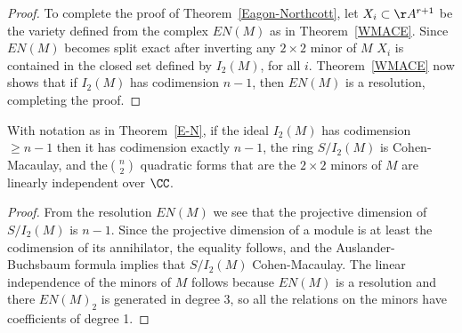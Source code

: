 \begin{proof}
% 

To complete the proof of Theorem~\ref{Eagon-Northcott},
let $X_{i}\subset \AA^{r+1}$ be the variety defined from the complex $EN(M)$ as in 
Theorem~\ref{WMACE}. Since $EN(M)$ becomes split exact after inverting any $2\times 2$ minor of $M$
$X_{i}$ is
contained in the closed set defined by $I_{2}(M)$, for all $i$. Theorem~\ref{WMACE} now shows that
 if $I_{2}(M)$ has codimension $n-1$,
then $EN(M)$ is a resolution, completing the proof.
\end {proof}

\begin{corollary}\label{E-N cor}
With notation as in Theorem~\ref{E-N}, if the ideal $I_2(M)$ has codimension $\geq n-1$ then it has
codimension exactly $n-1$, the ring $S/I_2(M)$ is Cohen-Macaulay, and the$\binom{n}{2}$ quadratic forms
that are the $2\times 2$ minors of $M$ are linearly independent over $\CC$.
\end{corollary}

\begin{proof}
From the resolution $EN(M)$ we see that the projective dimension of $S/I_2(M)$ is $n-1$. Since the projective dimension of a module
is at least the codimension of its annihilator, the equality follows, and the Auslander-Buchsbaum formula implies that $S/I_2(M)$ 
Cohen-Macaulay. The linear independence of the minors of $M$ follows because $EN(M)$ is a resolution and there
$EN(M)_2$ is generated in degree 3, so all the relations on the minors have coefficients of degree 1.
\end{proof}

